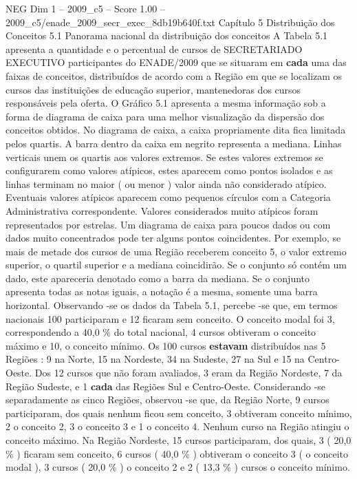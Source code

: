 \begin{textsample}{NEG Dim 1 – 2009\_c5 – Score 1.00 – 2009\_c5/enade\_2009\_secr\_exec\_8db19b640f.txt}  \label{ex:f1_neg_295}
Capítulo 5 Distribuição dos Conceitos 5.1 Panorama nacional da distribuição dos conceitos A Tabela 5.1 apresenta a quantidade e o percentual de cursos de SECRETARIADO EXECUTIVO participantes do ENADE/2009 que se situaram em \textbf{cada} uma das faixas de conceitos, distribuídos de acordo com a Região em que se localizam os cursos das instituições de educação superior, mantenedoras dos cursos responsáveis pela oferta.
O Gráfico 5.1 apresenta a mesma informação sob a forma de diagrama de caixa para uma melhor visualização da dispersão dos conceitos obtidos.
No diagrama de caixa, a caixa propriamente dita fica limitada pelos quartis.
A barra dentro da caixa em negrito representa a mediana.
Linhas verticais unem os quartis aos valores extremos.
Se estes valores extremos se configurarem como valores atípicos, estes aparecem como pontos isolados e as linhas terminam no maior ( ou menor ) valor ainda não considerado atípico.
Eventuais valores atípicos aparecem como pequenos círculos com a Categoria Administrativa correspondente.
Valores considerados muito atípicos foram representados por estrelas.
Um diagrama de caixa para poucos dados ou com dados muito concentrados pode ter alguns pontos coincidentes.
Por exemplo, se mais de metade dos cursos de uma Região receberem conceito 5, o valor extremo superior, o quartil superior e a mediana coincidirão.
Se o conjunto só contém um dado, este apareceria denotado como a barra da mediana.
Se o conjunto apresenta todas as notas iguais, a notação é a mesma, somente uma barra horizontal.
Observando -se os dados da Tabela 5.1, percebe -se que, em termos nacionais 100 participaram e 12 ficaram sem conceito.
O conceito modal foi 3, correspondendo a 40,0 \% do total nacional, 4 cursos obtiveram o conceito máximo e 10, o conceito mínimo.
Os 100 cursos \textbf{estavam} distribuídos nas 5 Regiões : 9 na Norte, 15 na Nordeste, 34 na Sudeste, 27 na Sul e 15 na Centro-Oeste.
Dos 12 cursos que não foram avaliados, 3 eram da Região Nordeste, 7 da Região Sudeste, e 1 \textbf{cada} das Regiões Sul e Centro-Oeste.
Considerando -se separadamente as cinco Regiões, observou -se que, da Região Norte, 9 cursos participaram, dos quais nenhum ficou sem conceito, 3 obtiveram conceito mínimo, 2 o conceito 2, 3 o conceito 3 e 1 o conceito 4.
Nenhum curso na Região atingiu o conceito máximo.
Na Região Nordeste, 15 cursos participaram, dos quais, 3 ( 20,0 \% ) ficaram sem conceito, 6 cursos ( 40,0 \% ) obtiveram o conceito 3 ( o conceito modal ), 3 cursos ( 20,0 \% ) o conceito 2 e 2 ( 13,3 \% ) cursos o conceito mínimo.

\end{textsample}
